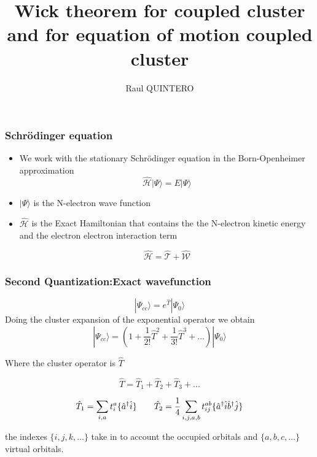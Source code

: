 \documentclass{beamer}
\author{Raul QUINTERO}
\title{Wick theorem for coupled cluster and for equation of motion coupled cluster}
\institute{LCPQ}
\begin{document}
\begin{frame}
\titlepage
\end{frame}




\begin{frame}
\frametitle{Schrödinger equation}

\begin{itemize}
\item We work with the stationary Schrödinger equation in the Born-Openheimer approximation
\[ 
\hat{\mathcal{H}} | \Psi\rangle=E| \Psi\rangle
\]

\item $ | \Psi\rangle$ is the N-electron  wave function

\item $ \hat{\mathcal{H}}$ is the Exact Hamiltonian that contains the the N-electron kinetic energy and the electron electron interaction term

\[
\hat{\mathcal{H}}=  \hat{\mathcal{T}}+\hat{\mathcal{W}}
\]

\end{itemize}

\end{frame}










\begin{frame}
\frametitle{Second Quantization:Exact wavefunction}
\[
 | \Psi_{cc} \rangle = e^{\hat{T}} | \Psi_{0}  \rangle
 \]
Doing the cluster expansion of the exponential operator we obtain
 \[
 | \Psi_{cc} \rangle = \left(1+\frac{1}{2!} \hat{T}^{2}+\frac{1}{3!} \hat{T}^{3} + ...   \right)  | \Psi_{0} \rangle 
 \]

 Where the cluster operator is $ \hat{T}$
  
\[
 \hat{T}= \hat{T}_{1}+ \hat{T}_{2}+\hat{T}_{3}+...
\]
 
\[
 \hat{T}_{1} = \sum_{i,a}t^{a}_{i} \{ \textcolor{black}{\hat{a}^{\dagger}}\textcolor{black}{\hat{i}} \}
  \qquad 
   \hat{T}_{2}=\frac{1}{4} \sum_{i,j,a,b}t^{ab}_{ij}\{ \textcolor{black}{\hat{a}^{\dagger}}\textcolor{black}{\hat{i}}\textcolor{black}{\hat{b}^{\dagger}}\textcolor{black}{\hat{j}} \} 
\]

 
the indexes $\{i,j,k, \ldots  \}$ take in to account the occupied orbitals and  $\{a,b,c, \ldots  \}$ virtual orbitals. 
\end{frame}
\end{document}
